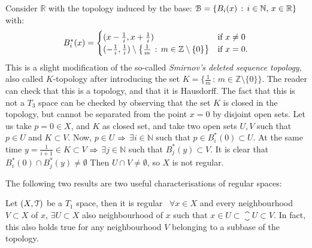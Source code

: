 \begin{example}
	Consider $\mathbb{R}$ with the topology induced by the base:
	$\EuScript{B}=\left\{B_i(x)\,:\,i\in\mathbb{N},\,x\in\mathbb{R}\right\}$ with:
	\[
		B_i^*(x)=\begin{cases}
					(x-\frac{1}{i},x+\frac{1}{i}) & \text{if } x\neq 0\\
					(-\frac{1}{i},\frac{1}{i})\setminus\left\{\frac{1}{m}\,:\,m\in\mathbb{Z}\setminus\{0\}\right\} & \text{if } x=0.
		\end{cases}
	\]
	This is a slight modification of the so-called \emph{Smirnov's deleted sequence topology}, also called $K$-topology after introducing the set $K=\{\frac{1}{m}\,:\,m\in\mathbb{Z}\setminus\{0\}\}$.
	The reader can check that this is a topology, and that it is Hausdorff.
	The fact that this is not a $T_3$ space can be checked by observing that the set $K$ is closed in the topology, but cannot be separated from the point $x=0$ by disjoint open sets.
	Let us take $p=0\in X$, and $K$ as closed set, and take two open sets $U,V$ such that $p\in U$ and $K\subset V$.
	Now, $p\in U$ $\Rightarrow$ $\exists i\in\mathbb{N}$ such that $p\in B_i^*(0)\subset U$.
	At the same time $y=\frac{1}{i+1}\in K\subset V$ $\Rightarrow$ $\exists j\in\mathbb{N}$ such that $B_j^*(y)\subset V$.
	It is clear that $B_i^*(0)\cap B_j^*(y)\neq\emptyset$
	Then $U\cap V\neq \emptyset$, so $X$ is not regular.
\end{example}

The following two results are two useful characterisations of regular spaces:

\begin{theorem}
	\label{th:regular-space-characterisation-1}
	Let $(X, \EuScript{T})$ be a $T_1$ space, then it is regular \iff\ $\forall x\in X$ and every neighbourhood $V\subset X$ of $x$, $\exists U\subset X$ also neighbourhood of $x$ such that $x\in U\subset \closure{U}\subset V$. In fact, this also holds true for any neighbourhood $V$ belonging to a subbase of the topology.
\end{theorem}

